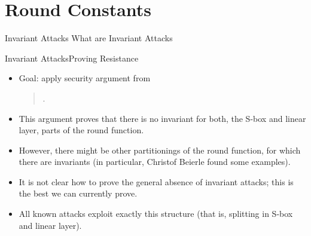 \section{Round Constants}
\begin{frame}{Invariant Attacks}
    What are Invariant Attacks
\end{frame}

\begin{frame}{Invariant Attacks}{Proving Resistance}
    \begin{itemize}
        \item Goal: apply security argument from
              \begin{quote}
                  .
              \end{quote}
        \item This argument proves that there is no invariant for both, the S-box and linear layer, parts of the round function.
        \item However, there might be other partitionings of the round function, for which there are invariants (in particular, Christof Beierle found some examples).
        \item It is not clear how to prove the general absence of invariant attacks; this is the best we can currently prove.
        \item All known attacks exploit exactly this structure (that is, splitting in S-box and linear layer).
    \end{itemize}
\end{frame}

